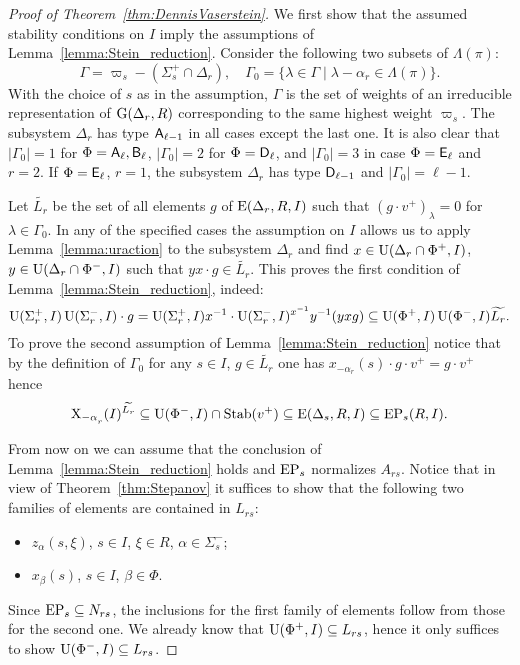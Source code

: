 \begin{proof}[Proof of Theorem~\ref{thm:DennisVaserstein}]
We first show that the assumed stability conditions on $I$ imply the assumptions of Lemma~\ref{lemma:Stein_reduction}.
Consider the following two subsets of $\Lambda(\pi)$:
$$\Gamma = \varpi_s- (\Sigma_s^+\cap \Delta_r),\quad \Gamma_0 = \{\lambda \in \Gamma \mid \lambda - \alpha_r \in \Lambda(\pi) \}.$$
With the choice of $s$ as in the assumption, $\Gamma$ is the set of weights of an irreducible representation of $\operatorname{G}(\Delta_r, R)$ corresponding to the same highest weight $\varpi_s$.
The subsystem $\Delta_r$ has type $\mathsf{A}_{\ell-1}$ in all cases except the last one.
It is also clear that $|\Gamma_0|=1$ for $\Phi=\mathsf{A}_\ell, \mathsf{B}_\ell$, $|\Gamma_0|=2$ for $\Phi=\mathsf{D}_\ell$, and $|\Gamma_0|=3$ in case $\Phi=\mathsf{E}_\ell$ and $r=2$.
If $\Phi=\mathsf{E}_\ell$, $r=1$, the subsystem $\Delta_r$ has type $\mathsf{D}_{\ell-1}$ and $|\Gamma_0|=\ell-1$.

Let $\widetilde{L_r}$ be the set of all elements $g$ of $\operatorname{E}(\Delta_r,R, I)$ such that $(g \cdot v^+)_\lambda = 0$ for $\lambda\in\Gamma_0$.
In any of  the specified cases the assumption on $I$ allows us to apply Lemma~\ref{lemma:uraction} to the subsystem $\Delta_r$ and find
$x\in\operatorname{U}(\Delta_r\cap\Phi^+, I)$, $y\in \operatorname{U}(\Delta_r\cap\Phi^-, I)$ such that $yx\cdot g \in \widetilde{L_r}$.
This proves the first condition of Lemma~\ref{lemma:Stein_reduction}, indeed:
\[ \operatorname{U}(\Sigma^+_r, I) \operatorname{U}(\Sigma^-_r, I) \cdot g = \operatorname{U}(\Sigma^+_r, I) x^{-1} \cdot \operatorname{U}(\Sigma^-_r, I)^{x^{-1}} y^{-1} (yxg) \subseteq \operatorname{U}(\Phi^+, I) \operatorname{U}(\Phi^-, I) \widetilde{L_r}. \]
To prove the second assumption of Lemma~\ref{lemma:Stein_reduction} notice that by the definition of $\Gamma_0$ for any $s\in I$, $ g\in\widetilde{L_r}$ one has $x_{-\alpha_r}(s) \cdot g \cdot v^+ = g \cdot v^+$ hence
\[ \X_{-\alpha\ssub{r}}(I)^{\widetilde{L_r}} \subseteq \U(\Phi^-, I) \cap \Stab(v^+) \subseteq \E(\Delta_s, R, I) \subseteq \EP_s(R, I). \]

From now on we can assume that the conclusion of Lemma~\ref{lemma:Stein_reduction} holds and $\operatorname{EP}_s$ normalizes $A_{rs}$.
Notice that in view of Theorem~\ref{thm:Stepanov} it suffices to show that the following two families of elements are contained in $L_{rs}$:
\begin{itemize} \item $z_{\alpha}(s, \xi)$, $s\in I$, $\xi \in R$, $\alpha\in\Sigma^-_s$;
\item $x_{\beta}(s)$, $s \in I$, $\beta \in \Phi$. \end{itemize}
Since $\operatorname{EP}_s \subseteq N_{rs}$, the inclusions for the first family of elements follow from those for the second one.
We already know that $\operatorname{U}(\Phi^+, I) \subseteq L_{rs}$, hence it only suffices to show $\operatorname{U}(\Phi^-, I) \subseteq L_{rs}$.


\end{proof}
